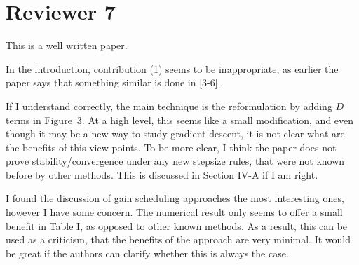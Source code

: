 \section*{Reviewer 7}\label{sec:reviewer7}
\renewcommand{\theequation}{R7.\arabic{equation}}
\setcounter{equation}{0}
\begin{rebuttal}[resolved]
    {%
        This is a well written paper.
    }%
    {%
    }%
\end{rebuttal}
\begin{rebuttal}[resolved]
    {%
        In the introduction, contribution (1) seems to be inappropriate, as earlier the paper says that something similar is done in [3-6].
    }%
    {%
    }%
\end{rebuttal}
\begin{rebuttal}[pending]
    {%
        If I understand correctly, the main technique is the reformulation by adding $D$ terms in Figure~3. At a high level, this seems like a small modification, and even though it may be a new way to study gradient descent, it is not clear what are the benefits of this view points. To be more clear, I think the paper does not prove stability/convergence under any new stepsize rules, that were not known before by other methods. This is discussed in Section IV-A if I am right.
    }%
    {%
    }%
\end{rebuttal}
\begin{rebuttal}[pending]
    {%
        I found the discussion of gain scheduling approaches the most interesting ones, however I have some concern. The numerical result only seems to offer a small benefit in Table I, as opposed to other known methods. As a result, this can be used as a criticism, that the benefits of the approach are very minimal. It would be great if the authors can clarify whether this is always the case.
    }%
    {%
    }%
\end{rebuttal}
